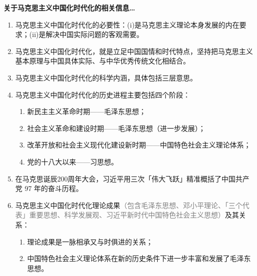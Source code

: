 \documentclass[UTF8]{ctexart}
\begin{document}
\begin{tcolorbox}[colback=brown!10, colframe=brown!20!black, boxrule=0.5pt, breakable, fontupper=\small]
\textbf{关于马克思主义中国化时代化的相关信息…}
\begin{enumerate}
  \item 马克思主义中国化时代化的必要性：(i)是马克思主义理论本身发展的内在要求；(ii)是解决中国实际问题的客观需要。
  \item 马克思主义中国化时代化，就是立足中国国情和时代特点，坚持把马克思主义基本原理与中国具体实际、与中华优秀传统文化相结合。
  \item 马克思主义中国化时代化的科学内涵，具体包括三层意思。
  \item 马克思主义中国化时代化的历史进程主要包括四个阶段：
  \begin{enumerate}[label={\roman{enumii})}, start=1]
    \item 新民主主义革命时期——毛泽东思想；
    \item 社会主义革命和建设时期——毛泽东思想（进一步发展）；
    \item 改革开放和社会主义现代化建设新时期——中国特色社会主义理论体系；
    \item 党的十八大以来——习思想。
  \end{enumerate}
  \item 在马克思诞辰200周年大会，习近平用三次「伟大飞跃」精准概括了中国共产党 97 年的奋斗历程。
  \item 马克思主义中国化时代化理论成果\textcolor{gray}{（包含毛泽东思想、邓小平理论、「三个代表」重要思想、科学发展观、习近平新时代中国特色社会主义思想）}及其关系：
  \begin{enumerate}[label={\roman{enumii})}, start=1]
    \item 理论成果是一脉相承又与时俱进的关系；
    \item 中国特色社会主义理论体系在新的历史条件下进一步丰富和发展了毛泽东思想。
  \end{enumerate}
\end{enumerate}

\end{tcolorbox}

\newpage
{}
\BgThispage
\pagecolor{c1-med}
\end{document}
